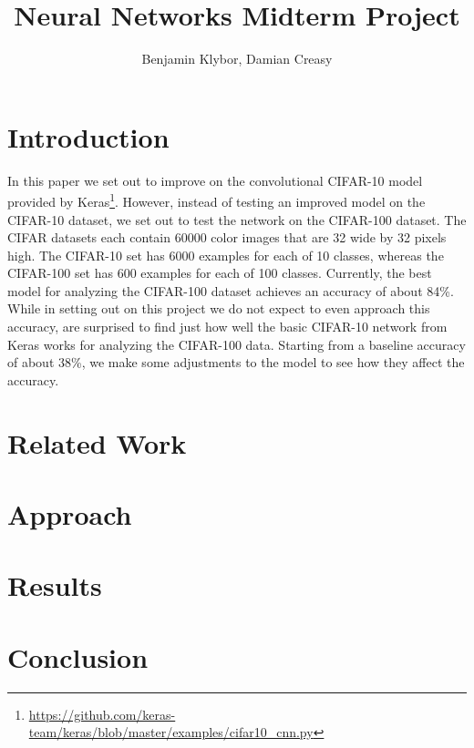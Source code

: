 \documentclass{article}
\title{Neural Networks Midterm Project}
\author{Benjamin Klybor, Damian Creasy}
\begin{document}
\maketitle

\section{Introduction}
In this paper we set out to improve on the convolutional CIFAR-10 model provided by Keras\footnote{\url{https://github.com/keras-team/keras/blob/master/examples/cifar10_cnn.py}}. However, instead of testing an improved model on the CIFAR-10 dataset, we set out to test the network on the CIFAR-100 dataset. The CIFAR datasets each contain 60000 color images that are 32 wide by 32 pixels high. The CIFAR-10 set has 6000 examples for each of 10 classes, whereas the CIFAR-100 set has 600 examples for each of 100 classes. Currently, the best model for analyzing the CIFAR-100 dataset achieves an accuracy of about 84\%. While in setting out on this project we do not expect to even approach this accuracy, are surprised to find just how well the basic CIFAR-10 network from Keras works for analyzing the CIFAR-100 data. Starting from a baseline accuracy of about 38\%, we make some adjustments to the model to see how they affect the accuracy.

\section{Related Work}

\section{Approach}

\section{Results}

\section{Conclusion}
\end{document}
